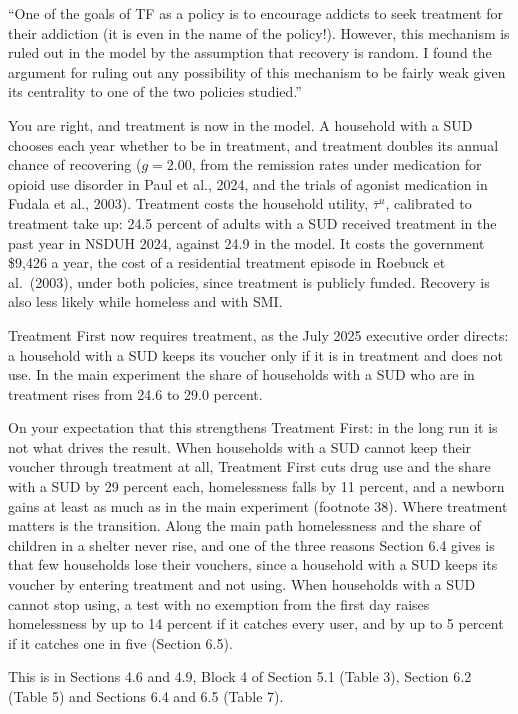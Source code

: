 \documentclass[11pt]{article}
\begin{document}
\begin{referee}
``One of the goals of TF as a policy is to encourage addicts to seek treatment for
their addiction (it is even in the name of the policy!). However, this mechanism
is ruled out in the model by the assumption that recovery is random. I found the
argument for ruling out any possibility of this mechanism to be fairly weak given
its centrality to one of the two policies studied.''
\end{referee}
\begin{response}
\concede You are right, and treatment is now in the model. A household with a SUD
chooses each year whether to be in treatment, and treatment doubles its annual
chance of recovering ($g=2.00$, from the remission rates under medication for
opioid use disorder in Paul et al., 2024, and the trials of agonist medication in
Fudala et al., 2003). Treatment costs the household utility, $\bar\tau^{u}$,
calibrated to treatment take up: 24.5 percent of adults with a SUD received
treatment in the past year in NSDUH 2024, against 24.9 in the model. It costs the
government \$9,426 a year, the cost of a residential treatment episode in Roebuck
et al.\ (2003), under both policies, since treatment is publicly funded. Recovery
is also less likely while homeless and with SMI.

Treatment First now requires treatment, as the July 2025 executive order directs:
a household with a SUD keeps its voucher only if it is in treatment and does not
use. In the main experiment the share of households with a SUD who are in
treatment rises from 24.6 to 29.0 percent.

On your expectation that this strengthens Treatment First: in the long run it is
not what drives the result. When households with a SUD cannot keep their voucher
through treatment at all, Treatment First cuts drug use and the share with a SUD
by 29 percent each, homelessness falls by 11 percent, and a newborn gains at
least as much as in the main experiment (footnote 38). Where treatment matters is
the transition. Along the main path homelessness and the share of children in a
shelter never rise, and one of the three reasons Section 6.4 gives is that few
households lose their vouchers, since a household with a SUD keeps its voucher by
entering treatment and not using. When households with a SUD cannot stop using, a
test with no exemption from the first day raises homelessness by up to 14 percent
if it catches every user, and by up to 5 percent if it catches one in five
(Section 6.5).

This is in Sections 4.6 and 4.9, Block 4 of Section 5.1 (Table 3), Section 6.2
(Table 5) and Sections 6.4 and 6.5 (Table 7).
\end{response}
\end{document}
